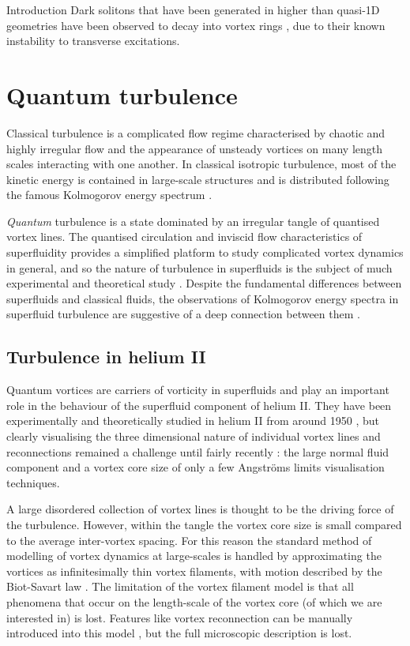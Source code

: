 \begin{chapter}{\label{cha:bose_gases}Introduction}
Dark solitons that have been generated in higher than quasi-1D geometries have been observed to decay into vortex rings \cite{PhysRevLett.86.2926,Dutton27072001,Shomroni09}, due to their known instability to transverse excitations.


\section{Quantum turbulence}
Classical turbulence is a complicated flow regime characterised by chaotic and highly irregular flow and the appearance of unsteady vortices on many length scales interacting with one another. In classical isotropic turbulence, most of the kinetic energy is contained in large-scale structures and is distributed following the famous Kolmogorov energy spectrum \cite{davidson2004turbulence}.

{\it Quantum} turbulence is a state dominated by an irregular tangle of quantised vortex lines. The quantised circulation and inviscid flow characteristics of superfluidity provides a simplified platform to study complicated vortex dynamics in general, and so the nature of turbulence in superfluids is the subject of much experimental and theoretical study \cite{Bradley11,skebek12,PhysRevLett.110.014502,barenghi_skrbek_14,PhysRevLett.115.155303}. Despite the fundamental differences between superfluids and classical fluids, the observations of Kolmogorov energy spectra in superfluid turbulence are suggestive of a deep connection between them \cite{barenghi_skrbek_14}. 

\subsection{Turbulence in helium II}
Quantum vortices are carriers of vorticity in superfluids and play an important role in the behaviour of the superfluid component of helium II. They have been experimentally and theoretically studied in helium II from around 1950 \cite{Donnelly}, but clearly visualising the three dimensional nature of individual vortex lines and reconnections remained a challenge until fairly recently \cite{Bewley09,Fonda12}: the large normal fluid component and a vortex core size of only a few Angstr\"oms limits visualisation techniques.

A large disordered collection of vortex lines is thought to be the driving force of the turbulence. However, within the tangle the vortex core size is small compared to the average inter-vortex spacing. For this reason the standard method of modelling of vortex dynamics at large-scales is handled by approximating the vortices as infinitesimally thin vortex filaments, with motion described by the Biot-Savart law \cite{barenghi_donnelly_01}. The limitation of the vortex filament model is that all phenomena that occur on the length-scale of the vortex core (of which we are interested in) is lost. Features like vortex reconnection can be manually introduced into this model \cite{barenghi_donnelly_01}, but the full microscopic description is lost.


\end{chapter}
